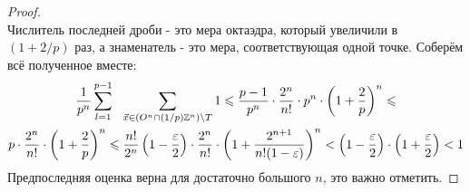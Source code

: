 \begin{proof}
\[	\]
	Числитель последней дроби - это мера октаэдра, который увеличили в $(1 + 2/p)$ раз, а знаменатель - это мера, соответствующая одной точке. Соберём всё полученное вместе:
	\begin{multline*}
		\frac{1}{p^n} \sum\limits_{l = 1}^{p - 1}\ \ \sum\limits_{\vec{x} \in (O^n \cap (1 / p)\mathbb{Z}^n) \backslash T} 1 \leqslant \frac{p - 1}{p^n} \cdot \frac{2^n}{n!} \cdot p^n \cdot \left(1 + \frac{2}{p}\right)^n \leqslant
		\\
		p \cdot \frac{2^n}{n!} \cdot \left(1 + \frac{2}{p}\right)^n \leqslant \frac{n!}{2^n} \left(1 - \frac{\varepsilon}{2}\right) \cdot \frac{2^n}{n!} \cdot \left(1 + \frac{2^{n + 1}}{n! (1 - \varepsilon)}\right)^n < \left(1 - \frac{\varepsilon}{2}\right) \cdot \left(1 + \frac{\varepsilon}{2}\right) < 1
	\end{multline*}
	Предпоследняя оценка верна для достаточно большого $n$, это важно отметить. 
\end{proof}